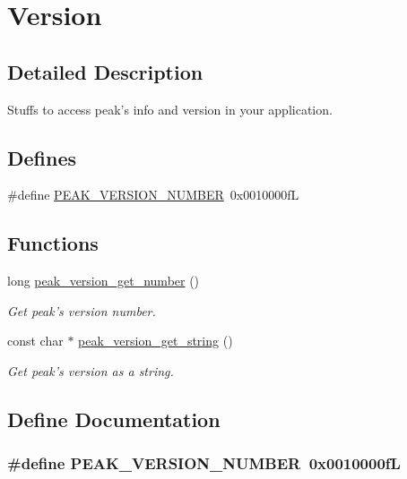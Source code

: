 \hypertarget{group__version}{
\section{Version}
\label{group__version}
}


\subsection{Detailed Description}
Stuffs to access peak's info and version in your application. 

\subsection*{Defines}
\begin{CompactItemize}
\item 
\#define \hyperlink{group__version_ga2}{PEAK\_\-VERSION\_\-NUMBER}\ 0x0010000f\-L
\end{CompactItemize}
\subsection*{Functions}
\begin{CompactItemize}
\item 
long \hyperlink{group__version_ga0}{peak\_\-version\_\-get\_\-number} ()
\begin{CompactList}\small\item\em Get peak's version number. \item\end{CompactList}\item 
const char $\ast$ \hyperlink{group__version_ga1}{peak\_\-version\_\-get\_\-string} ()
\begin{CompactList}\small\item\em Get peak's version as a string. \item\end{CompactList}\end{CompactItemize}


\subsection{Define Documentation}
\hypertarget{group__version_ga2}{
\subsubsection[PEAK\_\-VERSION\_\-NUMBER]{\setlength{\rightskip}{0pt plus 5cm}\#define PEAK\_\-VERSION\_\-NUMBER\ 0x0010000f\-L}}
\label{group__version_ga2}


